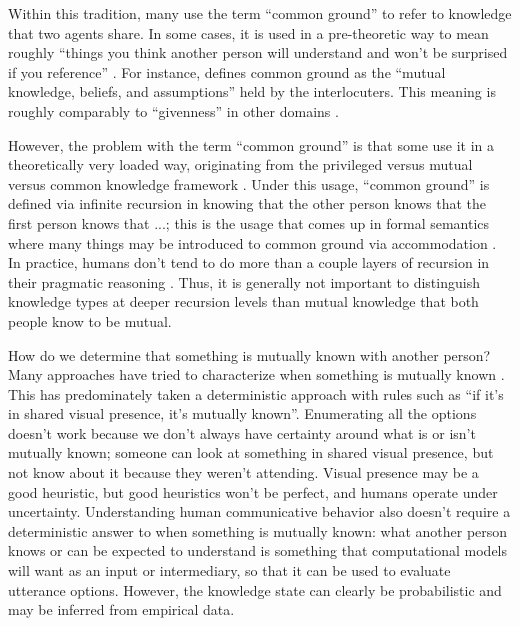 \documentclass[]{article}
\begin{document}
Within this tradition, many use the term ``common ground'' to refer to knowledge that two agents share. In some cases, it is used in a pre-theoretic way to mean roughly ``things you think another person will understand and won't be surprised if you reference'' \citep{leung2023, garrison2022}. For instance,  \citet{hanna2003} defines common ground as the ``mutual knowledge, beliefs, and assumptions'' held by the interlocuters. This meaning is roughly comparably to ``givenness'' in other domains \citep{fay2010}. 

 However, the problem with the term ``common ground'' is that some use it in a theoretically very loaded way, originating from the privileged versus mutual versus common knowledge framework \citep{clark1996}. Under this usage, ``common ground'' is defined via infinite recursion in knowing that the other person knows that the first person knows that ...; this is the usage that comes up in formal semantics where many things may be introduced to common ground via accommodation \citep{horton1996, pickering2004}. In practice, humans don't tend to do more than a couple layers of recursion in their pragmatic reasoning \citep{franke2016}. Thus, it is generally not important to distinguish knowledge types at deeper recursion levels than mutual knowledge that both people know to be mutual. 

How do we determine that something is mutually known with another person? Many approaches have tried to characterize when something is mutually known \citep{horton1996,clark1996, brown-schmidt2012}. This has predominately taken a deterministic approach with rules such as ``if it's in shared visual presence, it's mutually known''. Enumerating all the options doesn't work because we don't always have certainty around what is or isn't mutually known; someone can look at something in shared visual presence, but not know about it because they weren't attending. Visual presence may be a good heuristic, but good heuristics won't be perfect, and humans operate under uncertainty. Understanding human communicative behavior also doesn't require a deterministic answer to when something is mutually known: what another person knows or can be expected to understand is something that computational models will want as an input or intermediary, so that it can be used to evaluate utterance options. However, the knowledge state can clearly be probabilistic and may be inferred from empirical data. 


\end{document}
